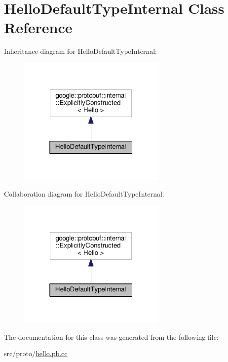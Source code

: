 \hypertarget{class_hello_default_type_internal}{}\section{Hello\+Default\+Type\+Internal Class Reference}
\label{class_hello_default_type_internal}


Inheritance diagram for Hello\+Default\+Type\+Internal\+:\nopagebreak
\begin{figure}[H]
\begin{center}
\leavevmode
\includegraphics[width=205pt]{class_hello_default_type_internal__inherit__graph}
\end{center}
\end{figure}


Collaboration diagram for Hello\+Default\+Type\+Internal\+:\nopagebreak
\begin{figure}[H]
\begin{center}
\leavevmode
\includegraphics[width=205pt]{class_hello_default_type_internal__coll__graph}
\end{center}
\end{figure}


The documentation for this class was generated from the following file\+:\begin{DoxyCompactItemize}
\item 
src/proto/\hyperlink{hello_8pb_8cc}{hello.\+pb.\+cc}\end{DoxyCompactItemize}
